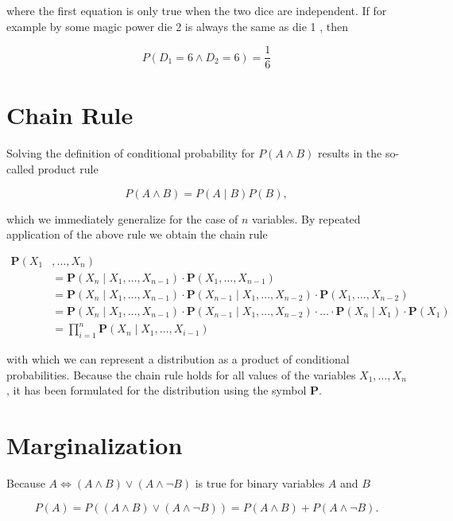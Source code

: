 \documentclass[10pt]{article}
\begin{document}
where the first equation is only true when the two dice are independent. If for example by some magic power die 2 is always the same as die 1 , then

$$
P\left(D_{1}=6 \wedge D_{2}=6\right)=\frac{1}{6}
$$

\section*{Chain Rule}
Solving the definition of conditional probability for $P(A \wedge B)$ results in the so-called product rule

$$
P(A \wedge B)=P(A \mid B) P(B),
$$

which we immediately generalize for the case of $n$ variables. By repeated application of the above rule we obtain the chain rule


\begin{align*}
\boldsymbol{P}\left(X_{1}\right. & \left., \ldots, X_{n}\right) \\
& =\boldsymbol{P}\left(X_{n} \mid X_{1}, \ldots, X_{n-1}\right) \cdot \boldsymbol{P}\left(X_{1}, \ldots, X_{n-1}\right) \\
& =\boldsymbol{P}\left(X_{n} \mid X_{1}, \ldots, X_{n-1}\right) \cdot \boldsymbol{P}\left(X_{n-1} \mid X_{1}, \ldots, X_{n-2}\right) \cdot \boldsymbol{P}\left(X_{1}, \ldots, X_{n-2}\right) \\
& =\boldsymbol{P}\left(X_{n} \mid X_{1}, \ldots, X_{n-1}\right) \cdot \boldsymbol{P}\left(X_{n-1} \mid X_{1}, \ldots, X_{n-2}\right) \cdot \ldots \cdot \boldsymbol{P}\left(X_{n} \mid X_{1}\right) \cdot \boldsymbol{P}\left(X_{1}\right) \\
& =\prod_{i=1}^{n} \boldsymbol{P}\left(X_{n} \mid X_{1}, \ldots, X_{i-1}\right) \tag{7.1}
\end{align*}


with which we can represent a distribution as a product of conditional probabilities. Because the chain rule holds for all values of the variables $X_{1}, \ldots, X_{n}$, it has been formulated for the distribution using the symbol $\boldsymbol{P}$.

\section*{Marginalization}
Because $A \Leftrightarrow(A \wedge B) \vee(A \wedge \neg B)$ is true for binary variables $A$ and $B$

$$
P(A)=P((A \wedge B) \vee(A \wedge \neg B))=P(A \wedge B)+P(A \wedge \neg B) .
$$
\end{document}
